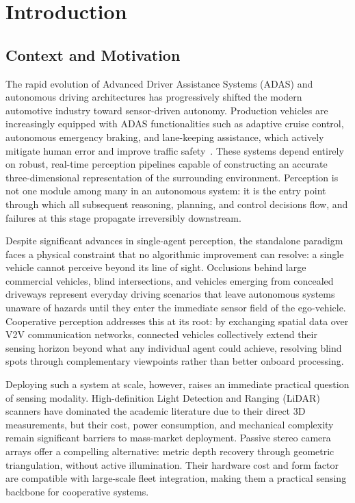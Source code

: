 \chapter{Introduction}
\label{ch:introduction}

\section{Context and Motivation}

The rapid evolution of Advanced Driver Assistance Systems (ADAS) and autonomous
driving architectures has progressively shifted the modern automotive industry
toward sensor-driven autonomy. Production vehicles are increasingly equipped with
ADAS functionalities such as adaptive cruise control, autonomous emergency
braking, and lane-keeping assistance, which actively mitigate human error and
improve traffic safety~\cite{yurtsever2020}. These systems depend entirely on
robust, real-time perception pipelines capable of constructing an accurate
three-dimensional representation of the surrounding environment. Perception is
not one module among many in an autonomous system: it is the entry point through
which all subsequent reasoning, planning, and control decisions flow, and
failures at this stage propagate irreversibly downstream.

Despite significant advances in single-agent perception, the standalone paradigm
faces a physical constraint that no algorithmic improvement can resolve: a single
vehicle cannot perceive beyond its line of sight. Occlusions behind large
commercial vehicles, blind intersections, and vehicles emerging from concealed
driveways represent everyday driving scenarios that leave autonomous systems
unaware of hazards until they enter the immediate sensor field of the
ego-vehicle. Cooperative perception addresses this at its root: by exchanging
spatial data over V2V communication networks, connected vehicles collectively
extend their sensing horizon beyond what any individual agent could achieve,
resolving blind spots through complementary viewpoints rather than better onboard
processing.

Deploying such a system at scale, however, raises an immediate practical question
of sensing modality. High-definition Light
Detection and Ranging (LiDAR) scanners have dominated the academic
literature due to their direct 3D measurements, but their cost, power
consumption, and mechanical complexity remain significant barriers to mass-market
deployment. Passive stereo camera arrays offer a compelling alternative: metric
depth recovery through geometric triangulation, without active illumination.
Their hardware cost and form factor are compatible with large-scale fleet
integration, making them a practical sensing backbone for cooperative systems.

